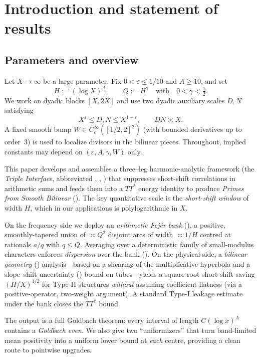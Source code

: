\section{Introduction and statement of results}\label{sec:intro}

\subsection{Parameters and overview}\label{ass:bank}
Let $X\to\infty$ be a large parameter. Fix $0<\varepsilon\le 1/10$ and $A\ge 10$, and set 
\[
H := (\log X)^A,\qquad Q := H^\gamma\quad\text{with}\quad 0<\gamma<\tfrac12.
\]
We work on dyadic blocks $[X,2X]$ and use two dyadic auxiliary scales $D,N$ satisfying
\[
X^\varepsilon \le D,N \le X^{1-\varepsilon},\qquad DN\asymp X.
\]
A fixed smooth bump $W\in C_c^\infty([1/2,2]^2)$ (with bounded derivatives up to order~$3$) is used to localize divisors in the bilinear pieces. Throughout, implied constants may depend on $(\varepsilon,A,\gamma,W)$ only.

\medskip
This paper develops and assembles a three–leg harmonic-analytic framework (the \emph{Triple Interface}, abbreviated \TFA, \AO, \BG) that suppresses short-shift correlations in arithmetic sums and feeds them into a $TT^\ast$ energy identity to produce \emph{Primes from Smooth Bilinear} (\PSB). The key quantitative scale is the \emph{short-shift window} of width $H$, which in our applications is polylogarithmic in $X$.

On the frequency side we deploy an \emph{arithmetic Fej\'er bank} (\TFA), a positive, smoothly-tapered union of $\asymp Q^2$ disjoint arcs of width $\asymp 1/H$ centred at rationals $a/q$ with $q\le Q$. Averaging over a deterministic family of small-modulus characters enforces \emph{dispersion} over the bank (\AO). On the physical side, a \emph{bilinear geometry} (\BG) analysis---based on a shearing of the multiplicative hyperbola and a slope--shift uncertainty (\SSU) bound on tubes---yields a square-root short-shift saving $(H/X)^{1/2}$ for Type-II structures \emph{without} assuming coefficient flatness (via a positive-operator, two-weight argument). A standard Type-I leakage estimate under the bank closes the $TT^\ast$ bound.

The output is a full Goldbach theorem: every interval of length $C(\log x)^A$ contains a \emph{Goldbach even}. We also give two ``uniformizers'' that turn band-limited mean positivity into a uniform lower bound at \emph{each} centre, providing a clean route to pointwise upgrades.

